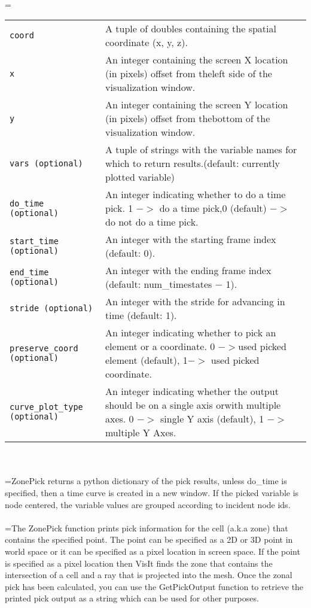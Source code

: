 \documentclass[10pt,a4paper]{report}
\begin{document}
 \\ 
\hangindent=\parindent 
\begin{tabular}{lp{9cm}}
\verb!coord! & A tuple of doubles containing the spatial coordinate (x, y, z). \\
\verb!x! & An integer containing the screen X location (in pixels) offset from theleft side of the visualization window. \\
\verb!y! & An integer containing the screen Y location (in pixels) offset from thebottom of the visualization window. \\
\verb!vars (optional)! & A tuple of strings with the variable names for which to return results.(default: currently plotted variable) \\
\verb!do_time (optional)! & An integer indicating whether to do a time pick. 1 $-$$>$ do a time pick,0 (default) $-$$>$ do not do a time pick. \\
\verb!start_time (optional)! & An integer with the starting frame index (default: 0). \\
\verb!end_time (optional)! & An integer with the ending frame index (default: num\_timestates $-$ 1). \\
\verb!stride (optional)! & An integer with the stride for advancing in time (default: 1). \\
\verb!preserve_coord (optional)! & An integer indicating whether to pick an element or a coordinate. 0 $-$$>$used picked element (default), 1$-$$>$ used picked coordinate. \\
\verb!curve_plot_type (optional)! & An integer indicating whether the output should be on a single axis orwith multiple axes. 0 $-$$>$ single Y axis (default), 1 $-$$>$ multiple Y Axes. \\
\end{tabular} \\[-2mm]


 \\ 
\hangindent=\parindent ZonePick returns a python dictionary of the pick results, unless do\_time is specified, then a time curve is created in a new window. If the picked variable is node centered, the variable values are grouped according to incident node ids. \\[-3mm] 

 \\ 
\hangindent=\parindent The ZonePick function prints pick information for the cell (a.k.a zone) that contains the specified point. The point can be specified as a 2D or 3D point in world space or it can be specified as a pixel location in screen space. If the point is specified as a pixel location then VisIt finds the zone that contains the intersection of a cell and a ray that is projected into the mesh. Once the zonal pick has been calculated, you can use the GetPickOutput function to retrieve the printed pick output as a string which can be used for other purposes. \\[-3mm] 
\end{document}
